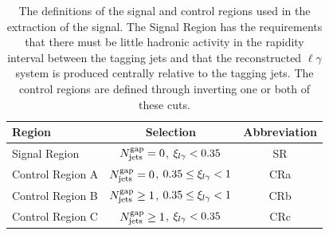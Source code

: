 \begin{table}[t]
  \centering
  \begin{tabular}{|l|c|c|}
  \hline
  Region & Selection & Abbreviation \\ \hline
  Signal Region & $N^{\text{gap}}_{\text{jets}} = 0$, $\xi_{l\gamma} < 0.35$ & SR \\
  Control Region A & $N^{\text{gap}}_{\text{jets}} = 0$, $0.35 \leq \xi_{l\gamma} < 1$ & CRa \\
  Control Region B & $N^{\text{gap}}_{\text{jets}} \geq 1$, $0.35 \leq \xi_{l\gamma} < 1$ & CRb \\
  Control Region C & $N^{\text{gap}}_{\text{jets}} \geq 1$, $\xi_{l\gamma} < 0.35$ & CRc \\
  \hline
  \end{tabular}
  \caption{\label{tab:vbswy:regions} The definitions of the signal and control regions used in the extraction of the \ewwy signal. The Signal Region has the requirements that there must be little hadronic activity in the rapidity interval between the tagging jets and that the reconstructed $\ell\gamma$ system is produced centrally relative to the tagging jets. The control regions are defined through inverting one or both of these cuts.}
\end{table}  
%
%

